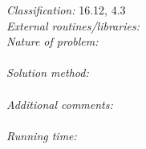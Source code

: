 \documentclass[preprint,12pt]{elsarticle}
\begin{document}
\begin{small}
{\em Classification:} 16.12, 4.3                                \\
{\em External routines/libraries:}                            \\
{\em Nature of problem:}\\
   \\
{\em Solution method:}\\
   \\
{\em Additional comments:}\\
   \\
{\em Running time:}\\
   \\

\end{small}

\listoftodos{}
\end{document}
